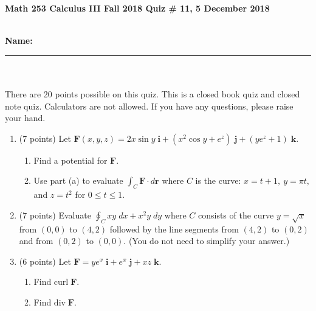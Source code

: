 \documentclass[11pt]{article}
\theoremstyle{remark}
\def\be{\begin{enumerate}}
\def\ee{\end{enumerate}}
\begin{document}
{\bf Math 253 Calculus III Fall 2018 \hfill Quiz \# 11,  5 December 2018 }\\
\\
{\bf Name: \rule{3.5in}{1pt}}\\
\\
\noindent There are 20 points possible on this quiz. This is a closed
book quiz and closed note quiz. Calculators are not allowed. If you have any questions, please
raise your hand.

\begin{enumerate}
\item (7 points) Let $\textbf{F}(x,y,z)=2x\sin y\;\textbf{i} +(x^2 \cos y +e^z)\;\textbf{j}+(ye^z+1)\;\textbf{k}.$
\be
\item  Find a potential for  $\textbf{F}.$
\vspace{1.5in}

\item Use part (a) to evaluate $\int_C \textbf{F} \cdot d\textbf{r}$ where  $C$ is the curve: $x=t+1,\: y=\pi t,$ and $z=t^2$ for $0 \leq t \leq 1.$
\vfill
\ee
\newpage
\item (7 points) Evaluate $\oint_C xy \;dx +x^2y \; dy$ where $C$ consists of the curve $y=\sqrt{x}$ from $(0,0)$ to $(4,2)$ followed by the line segments from $(4,2)$ to $(0,2)$ and from $(0,2)$ to $(0,0).$ (You do not need to simplify your answer.)
\vfill

\item (6 points) Let $\textbf{F}= ye^x\;\textbf{i} +e^x\;\textbf{j}+xz\;\textbf{k}.$
	\be
	\item Find $\text{curl}\; \textbf{F}.$
	\vspace{2in}
	\item Find $\text{div}\; \textbf{F}.$
	\vspace{1.5in}
	\ee
	
\end{enumerate}
\end{document}
